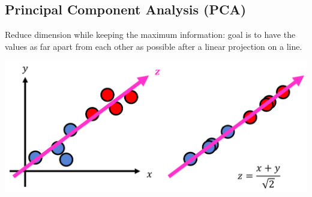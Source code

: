 \subsection*{Principal Component Analysis (PCA)}
    Reduce dimension while keeping the maximum information: goal is to have the values as far apart from each other as possible after a linear projection on a line.\\
    {\centering \includegraphics*[width = 0.7\linewidth]{src/8_ml/images/pca.png} \par}